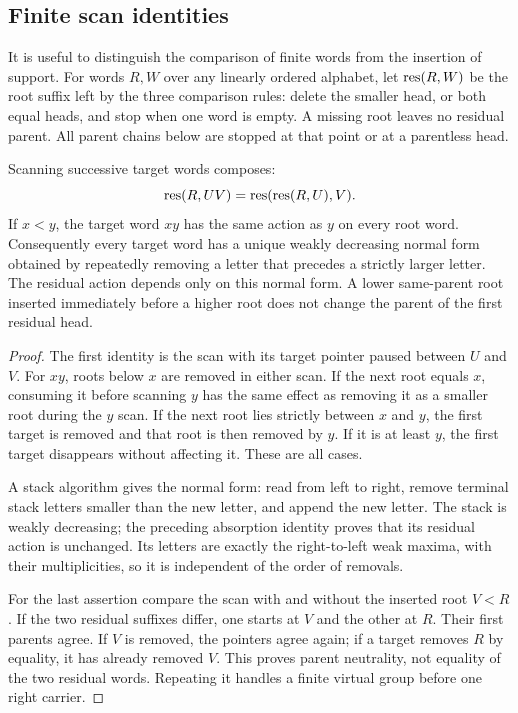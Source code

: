 \subsection{Finite scan identities}\label{sec:word-calculus}
It is useful to distinguish the comparison of finite words from the
insertion of support. For words $R,W$ over any linearly ordered alphabet,
let $\operatorname{res}(R,W)$ be the root suffix left by the three comparison rules:
delete the smaller head, or both equal heads, and stop when one word is
empty. A missing root leaves no residual parent. All parent chains below
are stopped at that point or at a parentless head.

\begin{lemma}\label{lem:word}
Scanning successive target words composes:
\[
 \operatorname{res}(R,UV)=\operatorname{res}(\operatorname{res}(R,U),V).
\]
If $x<y$, the target word $xy$ has the same action as $y$ on every
root word. Consequently every target word has a unique weakly decreasing
normal form obtained by repeatedly removing a letter that precedes a
strictly larger letter. The residual action depends only on this normal
form. A lower same-parent root inserted immediately before a higher root
does not change the parent of the first residual head.
\end{lemma}
\begin{proof}
The first identity is the scan with its target pointer paused between
$U$ and $V$. For $xy$, roots below $x$ are removed in either scan. If
the next root equals $x$, consuming it before scanning $y$ has the same
effect as removing it as a smaller root during the $y$ scan. If the next
root lies strictly between $x$ and $y$, the first target is removed and
that root is then removed by $y$. If it is at least $y$, the first
target disappears without affecting it. These are all cases.

A stack algorithm gives the normal form: read from left to right,
remove terminal stack letters smaller than the new letter, and append
the new letter. The stack is weakly decreasing; the preceding absorption
identity proves that its residual action is unchanged. Its letters are
exactly the right-to-left weak maxima, with their multiplicities, so it
is independent of the order of removals.

For the last assertion compare the scan with and without the inserted
root $V<R$. If the two residual suffixes differ, one starts at $V$ and
the other at $R$. Their first parents agree. If $V$ is removed, the
pointers agree again; if a target removes $R$ by equality, it has already
removed $V$. This proves parent neutrality, not equality of the two
residual words. Repeating it handles a finite virtual group before one
right carrier.
\end{proof}

